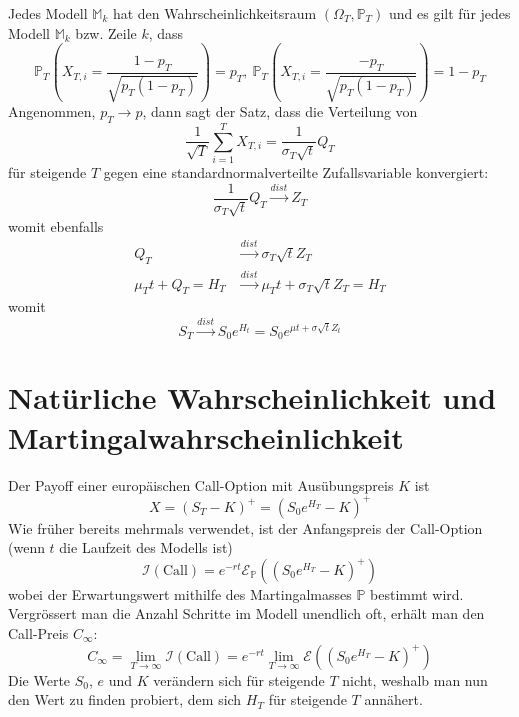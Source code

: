 \documentclass[11pt]{report} %
\begin{document}
Jedes Modell $\mathbb{M}_k$ hat den Wahrscheinlichkeitsraum $(\Omega_T, \mathbb{P}_T)$ und es gilt für jedes Modell $\mathbb{M}_k$ bzw. Zeile $k$, dass $$\mathbb{P}_T\left(X_{T, i}=\frac{1-p_T}{\sqrt{p_T(1-p_T)}}\right)=p_T,\ \mathbb{P}_T\left(X_{T, i}=\frac{-p_T}{\sqrt{p_T(1-p_T)}}\right)=1-p_T$$
Angenommen, $p_T\rightarrow p$, dann sagt der Satz, dass die Verteilung von $$\frac{1}{\sqrt{T}}\sum_{i=1}^{T}X_{T, i}=\frac{1}{\sigma_T\sqrt{t}}Q_T$$ für steigende $T$ gegen eine standardnormalverteilte Zufallsvariable konvergiert: $$\frac{1}{\sigma_T\sqrt{t}}Q_T\xrightarrow{dist}Z_T$$ womit ebenfalls
\begin{align*}
    Q_T&\xrightarrow{dist}\sigma_T\sqrt{t}Z_T\\
    \mu_Tt+Q_T=H_T&\xrightarrow{dist}\mu_Tt+\sigma_T\sqrt{t}Z_T=H_T
\end{align*}
womit $$S_T\xrightarrow{dist}S_0e^{H_t}=S_0e^{\mu t+\sigma\sqrt{t}Z_t}$$
\section{Natürliche Wahrscheinlichkeit und Martingalwahrscheinlichkeit}
Der Payoff einer europäischen Call-Option mit Ausübungspreis $K$ ist $$X=(S_T-K)^+=(S_0e^{H_T}-K)^+$$ Wie früher bereits mehrmals verwendet, ist der Anfangspreis der Call-Option (wenn $t$ die Laufzeit des Modells ist) $$\mathcal{I}(\text{Call})=e^{-rt}\mathcal{E}_\mathbb{P}((S_0e^{H_T}-K)^+)$$ wobei der Erwartungswert mithilfe des Martingalmasses $\mathbb{P}$ bestimmt wird. Vergrössert man die Anzahl Schritte im Modell unendlich oft, erhält man den Call-Preis $C_\infty$:
$$C_\infty=\lim_{T\to\infty}\mathcal{I}(\text{Call})=e^{-rt}\lim_{T\to\infty}\mathcal{E}((S_0e^{H_T}-K)^+)$$
Die Werte $S_0$, $e$ und $K$ verändern sich für steigende $T$ nicht, weshalb man nun den Wert zu finden probiert, dem sich $H_T$ für steigende $T$ annähert.
\end{document}
